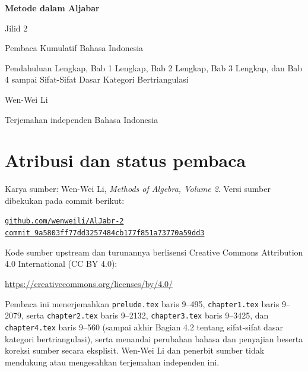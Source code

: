 \documentclass[
  colors=true,
  fontsetup=font-setup-id.tex,
  titlesetup=titles-setup.tex
]{AJbook2}
\theoremstyle{plain}
\theoremstyle{nonumberplain}
\numberwithin{equation}{section}
\numberwithin{figure}{section}
\begin{document}
\begin{titlepage}
  \centering
  \vspace*{0.16\textheight}
  {\Huge\bfseries Metode dalam Aljabar\par}
  \vspace{0.8em}
  {\LARGE Jilid 2\par}
  \vspace{1.8em}
  {\Large Pembaca Kumulatif Bahasa Indonesia\par}
  \vspace{0.6em}
  {\large Pendahuluan Lengkap, Bab 1 Lengkap, Bab 2 Lengkap, Bab 3 Lengkap, dan Bab 4 sampai Sifat-Sifat Dasar Kategori Bertriangulasi\par}
  \vfill
  {\Large Wen-Wei Li\par}
  \vspace{0.6em}
  {\normalsize Terjemahan independen Bahasa Indonesia\par}
  \vspace*{0.10\textheight}
\end{titlepage}

\cleardoublepage
\thispagestyle{empty}
\section*{Atribusi dan status pembaca}
Karya sumber: Wen-Wei Li, \emph{Methods of Algebra, Volume 2}. Versi
sumber dibekukan pada commit berikut:
\begin{center}
  \small
  \href{https://github.com/wenweili/AlJabr-2}{\texttt{github.com/wenweili/AlJabr-2}}\\
  \href{https://github.com/wenweili/AlJabr-2/commit/9a5803ff77dd3257484cb177f851a73770a59dd3}{\texttt{commit 9a5803ff77dd3257484cb177f851a73770a59dd3}}
\end{center}
Kode sumber upstream dan turunannya berlisensi Creative Commons
Attribution 4.0 International (CC BY 4.0):
\begin{center}
  \small\url{https://creativecommons.org/licenses/by/4.0/}
\end{center}
Pembaca ini menerjemahkan
\texttt{prelude.tex} baris 9--495, \texttt{chapter1.tex} baris 9--2079,
serta \texttt{chapter2.tex} baris 9--2132, \texttt{chapter3.tex} baris
9--3425, dan \texttt{chapter4.tex} baris 9--560 (sampai akhir Bagian 4.2
tentang sifat-sifat dasar kategori bertriangulasi), serta menandai
perubahan bahasa dan penyajian beserta koreksi sumber secara eksplisit.
Wen-Wei Li dan penerbit sumber tidak mendukung atau mengesahkan terjemahan
independen ini.
\end{document}
